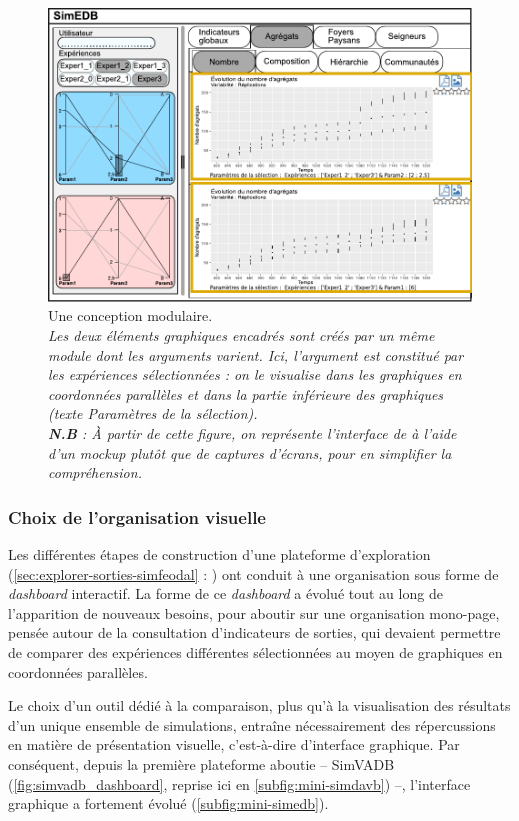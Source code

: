 \begin{figure}[H]
	\centering
	\includegraphics[width=\linewidth]{img/mockup_SimEDB_modules.pdf}
	\caption[Une conception modulaire.]{Une conception modulaire.\\
		\textit{Les deux éléments graphiques encadrés sont créés par un même \og module\fg{} dont les arguments varient.
		Ici, l'argument est constitué par les expériences sélectionnées : on le visualise dans les graphiques en coordonnées parallèles et dans la partie inférieure des graphiques (texte \og Paramètres de la sélection\fg{}).\\
		\textbf{N.B} : À partir de cette figure, on représente l'interface de \simedb{} à l'aide d'un \textit{mockup} plutôt que de captures d'écrans, pour en simplifier la compréhension.}}
	\label{fig:simedb-modules}
\end{figure}

\subsubsection{Choix de l'organisation visuelle}
Les différentes étapes de construction d'une plateforme d'exploration (\cref{sec:explorer-sorties-simfeodal} : ) ont conduit à une organisation sous forme de \textit{dashboard} interactif.
La forme de ce \textit{dashboard} a évolué tout au long de l'apparition de nouveaux besoins, pour aboutir sur une organisation mono-page, pensée autour de la consultation d'indicateurs de sorties, qui devaient permettre de comparer des expériences différentes sélectionnées au moyen de graphiques en coordonnées parallèles.

Le choix d'un outil dédié à la comparaison, plus qu'à la visualisation des résultats d'un unique ensemble de simulations, entraîne nécessairement des répercussions en matière de présentation visuelle, c'est-à-dire d'interface graphique.
Par conséquent, depuis la première plateforme aboutie -- SimVADB (\cref{fig:simvadb_dashboard}, reprise ici en \cref{subfig:mini-simdavb}) --, l'interface graphique a fortement évolué (\cref{subfig:mini-simedb}).
\clearpage

